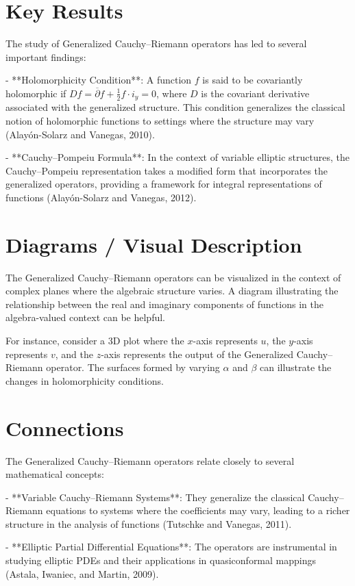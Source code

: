 \documentclass[11pt,a4paper]{article}
\begin{document}
\section{Key Results}
The study of Generalized Cauchy–Riemann operators has led to several important findings:

- **Holomorphicity Condition**: A function \( f \) is said to be covariantly holomorphic if \( Df = \overline{\partial} f + \frac{1}{2} f \cdot i_y = 0 \), where \( D \) is the covariant derivative associated with the generalized structure. This condition generalizes the classical notion of holomorphic functions to settings where the structure may vary (Alayón-Solarz and Vanegas, 2010).

- **Cauchy–Pompeiu Formula**: In the context of variable elliptic structures, the Cauchy–Pompeiu representation takes a modified form that incorporates the generalized operators, providing a framework for integral representations of functions (Alayón-Solarz and Vanegas, 2012).

\section{Diagrams / Visual Description}
The Generalized Cauchy–Riemann operators can be visualized in the context of complex planes where the algebraic structure varies. A diagram illustrating the relationship between the real and imaginary components of functions in the algebra-valued context can be helpful. 

For instance, consider a 3D plot where the \( x \)-axis represents \( u \), the \( y \)-axis represents \( v \), and the \( z \)-axis represents the output of the Generalized Cauchy–Riemann operator. The surfaces formed by varying \( \alpha \) and \( \beta \) can illustrate the changes in holomorphicity conditions.

\section{Connections}
The Generalized Cauchy–Riemann operators relate closely to several mathematical concepts:

- **Variable Cauchy–Riemann Systems**: They generalize the classical Cauchy–Riemann equations to systems where the coefficients may vary, leading to a richer structure in the analysis of functions (Tutschke and Vanegas, 2011).

- **Elliptic Partial Differential Equations**: The operators are instrumental in studying elliptic PDEs and their applications in quasiconformal mappings (Astala, Iwaniec, and Martin, 2009).
\end{document}
